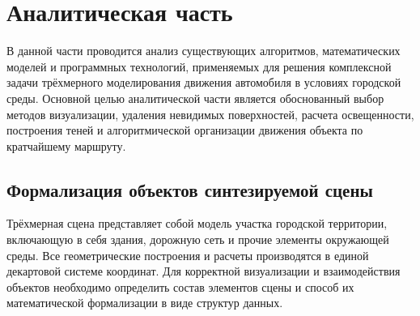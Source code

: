 \chapter{Аналитическая часть}

В данной части проводится анализ существующих алгоритмов, математических моделей и программных технологий, применяемых для решения комплексной задачи трёхмерного моделирования движения автомобиля в условиях городской среды. Основной целью аналитической части является обоснованный выбор методов визуализации, удаления невидимых поверхностей, расчета освещенности, построения теней и алгоритмической организации движения объекта по кратчайшему маршруту.

\section{Формализация объектов синтезируемой сцены}

Трёхмерная сцена представляет собой модель участка городской территории, включающую в себя здания, дорожную сеть и прочие элементы окружающей среды. Все геометрические построения и расчеты производятся в единой декартовой системе координат. Для корректной визуализации и взаимодействия объектов необходимо определить состав элементов сцены и способ их математической формализации в виде структур данных.

